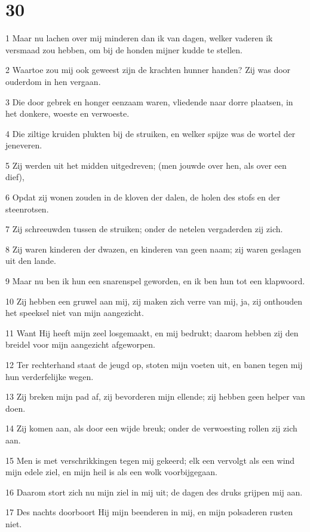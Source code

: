 \chapter{30}

\par 1 Maar nu lachen over mij minderen dan ik van dagen, welker vaderen ik versmaad zou hebben, om bij de honden mijner kudde te stellen.
\par 2 Waartoe zou mij ook geweest zijn de krachten hunner handen? Zij was door ouderdom in hen vergaan.
\par 3 Die door gebrek en honger eenzaam waren, vliedende naar dorre plaatsen, in het donkere, woeste en verwoeste.
\par 4 Die ziltige kruiden plukten bij de struiken, en welker spijze was de wortel der jeneveren.
\par 5 Zij werden uit het midden uitgedreven; (men jouwde over hen, als over een dief),
\par 6 Opdat zij wonen zouden in de kloven der dalen, de holen des stofs en der steenrotsen.
\par 7 Zij schreeuwden tussen de struiken; onder de netelen vergaderden zij zich.
\par 8 Zij waren kinderen der dwazen, en kinderen van geen naam; zij waren geslagen uit den lande.
\par 9 Maar nu ben ik hun een snarenspel geworden, en ik ben hun tot een klapwoord.
\par 10 Zij hebben een gruwel aan mij, zij maken zich verre van mij, ja, zij onthouden het speeksel niet van mijn aangezicht.
\par 11 Want Hij heeft mijn zeel losgemaakt, en mij bedrukt; daarom hebben zij den breidel voor mijn aangezicht afgeworpen.
\par 12 Ter rechterhand staat de jeugd op, stoten mijn voeten uit, en banen tegen mij hun verderfelijke wegen.
\par 13 Zij breken mijn pad af, zij bevorderen mijn ellende; zij hebben geen helper van doen.
\par 14 Zij komen aan, als door een wijde breuk; onder de verwoesting rollen zij zich aan.
\par 15 Men is met verschrikkingen tegen mij gekeerd; elk een vervolgt als een wind mijn edele ziel, en mijn heil is als een wolk voorbijgegaan.
\par 16 Daarom stort zich nu mijn ziel in mij uit; de dagen des druks grijpen mij aan.
\par 17 Des nachts doorboort Hij mijn beenderen in mij, en mijn polsaderen rusten niet.
